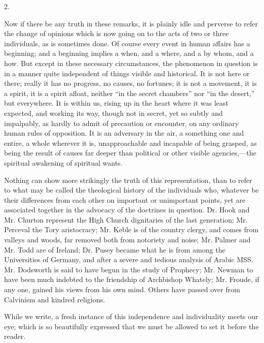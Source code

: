 2.

Now if there be any truth in these remarks, it is
plainly idle and perverse to refer the change of opinions which is now
going on to the acts of two or three individuals, as is sometimes
done. Of course every event in human affairs has a beginning; and a
beginning implies a when, and a where, and a by whom, and a how. But
except in these necessary circumstances, the phenomenon in question is
in a manner quite independent of things visible and historical. It is
not here or there; really it has no progress, no causes, no fortunes;
it is not a movement, it is a spirit, it is a spirit afloat, neither ``in
the secret chambers'' nor ``in the desert,'' but everywhere. It is within
us, rising up in the heart where it was least expected, and working
its way, though not in secret, yet so subtly and impalpably, as hardly
to admit of precaution or encounter, on any ordinary human rules of
opposition. It is an adversary in the air, a something one and entire,
a whole wherever it is, unapproachable and incapable of being grasped,
as being the result of causes far deeper than political or other
visible agencies,—the spiritual awakening of spiritual wants.

Nothing can show more strikingly the truth of
this representation, than to refer to what may be called the
theological history of the individuals who, whatever be their
differences from each other on important or unimportant points, yet
are associated together in the advocacy of the doctrines in question.
Dr. Hook and Mr. Churton represent the High Church dignitaries of the
last generation; Mr. Perceval the Tory aristocracy; Mr. Keble is
of the country clergy, and comes from valleys and woods, far removed
both from notoriety and noise; Mr. Palmer and Mr. Todd are of Ireland;
Dr. Pusey became what he is from among the Universities of Germany,
and after a severe and tedious analysis of Arabic MSS. Mr. Dodsworth
is said to have begun in the study of Prophecy; Mr. Newman to have
been much indebted to the friendship of Archbishop Whately; Mr. Froude,
if any one, gained his views from his own mind. Others have passed
over from Calvinism and kindred religions.

While we write, a fresh instance of this
independence and individuality meets our eye; which is so beautifully
expressed that we must be allowed to set it before the reader.

